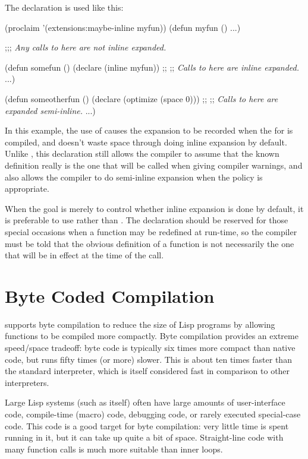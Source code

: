 The  declaration is used like this:
\begin{lisp}
(proclaim '(extensions:maybe-inline myfun))
(defun myfun () ...)

;;; \textit{Any calls to  here are not inline expanded.}

(defun somefun ()
  (declare (inline myfun))
  ;;
  ;; \textit{Calls to  here are inline expanded.}
  ...)

(defun someotherfun ()
  (declare (optimize (space 0)))
  ;;
  ;; \textit{Calls to  here are expanded semi-inline.}
  ...)
\end{lisp}
In this example, the use of  causes the
expansion to be recorded when the  for  is
compiled, and doesn't waste space through doing inline expansion by
default.  Unlike , this declaration still allows the
compiler to assume that the known definition really is the one that
will be called when giving compiler warnings, and also allows the
compiler to do semi-inline expansion when the policy is appropriate.

When the goal is merely to control whether inline expansion is done by
default, it is preferable to use  rather
than .  The  declaration should be
reserved for those special occasions when a function may be redefined
at run-time, so the compiler must be told that the obvious definition
of a function is not necessarily the one that will be in effect at the
time of the call.


\section{Byte Coded Compilation}
\label{byte-compile}

\python{} supports byte compilation to reduce the size of Lisp
programs by allowing functions to be compiled more compactly.  Byte
compilation provides an extreme speed/space tradeoff: byte code is
typically six times more compact than native code, but runs fifty
times (or more) slower.  This is about ten times faster than the
standard interpreter, which is itself considered fast in comparison to
other \clisp{} interpreters.

Large Lisp systems (such as \cmucl{} itself) often have large amounts
of user-interface code, compile-time (macro) code, debugging code, or
rarely executed special-case code.  This code is a good target for
byte compilation: very little time is spent running in it, but it can
take up quite a bit of space.  Straight-line code with many function
calls is much more suitable than inner loops.

